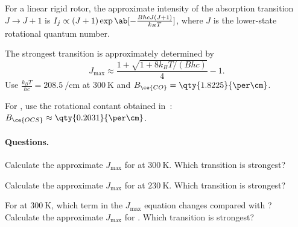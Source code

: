 \begin{problem}
  \leavevmode \vspace*{-.5\baselineskip}
  \begin{snugshade}
    \begin{enumext}[label = \ensuremath \ast]
      \item
      For a linear rigid rotor, the approximate intensity of the absorption
      transition $J \to J + 1$ is
      $I_j \propto (J + 1) \exp\ab[-\frac{BhcJ(J + 1)}{k_BT}]$, where $J$ is the
      lower-state rotational quantum number.
      \item
      The strongest transition is approximately determined by
      \[
        J_{\max} \approx \frac{1 + \sqrt{1 + 8k_BT/(Bhc)}}{4} - 1.
      \]
      Use $\frac{k_BT}{hc} = \qty{208.5}{\per\cm}$ at $\qty{300}\K$ and
      $B_{\ce{CO}} = \qty{1.8225}{\per\cm}$.
      \item
      For , use the rotational contant obtained
      in~: $B_{\ce{OCS}} \approx \qty{0.2031}{\per\cm}$.
    \end{enumext}
  \end{snugshade}
  \paragraph{Questions.}
  \begin{enumext}
    \item Calculate the approximate $J_{\max}$ for  at $\qty{300}\K$.
    Which transition is strongest?
    \item Calculate the approximate $J_{\max}$ for  at $\qty{230}\K$.
    Which transition is strongest?
    \item For  at $\qty{300}\K$, which term in the $J_{\max}$ equation
    changes compared with ? Calculate the approximate $J_{\max}$
    for . Which transition is strongest?
  \end{enumext}
\end{problem}

